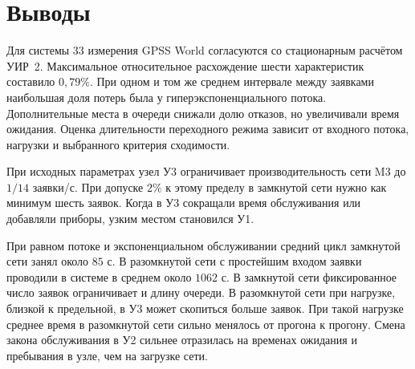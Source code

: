 \section{Выводы}

Для системы 33 измерения GPSS World согласуются со стационарным
расчётом УИР~2. Максимальное относительное расхождение шести
характеристик составило \(0{,}79\%\). При одном и том же среднем
интервале между заявками наибольшая доля потерь была
у гиперэкспоненциального потока. Дополнительные места в очереди
снижали долю отказов, но увеличивали время ожидания.
Оценка длительности переходного режима
зависит от входного потока, нагрузки и выбранного критерия сходимости.

При исходных параметрах узел У3 ограничивает производительность
сети M3 до \(1/14\) заявки/с. При допуске \(2\%\) к этому пределу
в замкнутой сети нужно как минимум шесть заявок. Когда в У3
сокращали время обслуживания или добавляли приборы, узким местом
становился У1.

При равном потоке и экспоненциальном обслуживании средний цикл
замкнутой сети занял около \(85\) с. В разомкнутой сети с простейшим
входом заявки проводили в системе в среднем около \(1062\) с.
В замкнутой сети фиксированное число заявок ограничивает и длину
очереди. В разомкнутой сети при нагрузке, близкой к предельной,
в У3 может скопиться больше заявок. При такой нагрузке среднее
время в разомкнутой сети сильно менялось от прогона к прогону.
Смена закона обслуживания в У2 сильнее отразилась на временах
ожидания и пребывания в узле, чем на загрузке сети.
